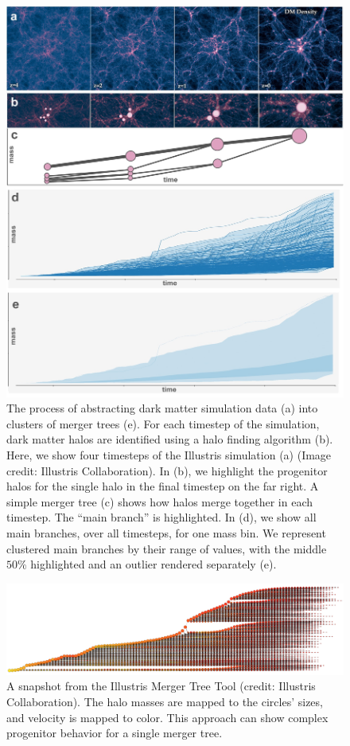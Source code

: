 \begin{figure}[h!]
\includegraphics[width=\textwidth]{images/clusters/particles_to_tree_cluster.jpg}
\caption{The process of abstracting dark matter simulation data (a) into clusters of merger trees (e). For each timestep of the simulation, dark matter halos are identified using a halo finding algorithm (b). Here, we show four timesteps of the Illustris simulation (a) (Image credit: Illustris Collaboration). In (b), we highlight the progenitor halos for the single halo in the final timestep on the far right. A simple merger tree (c) shows how halos merge together in each timestep. The ``main branch'' is highlighted. In (d), we show all main branches, over all timesteps, for one mass bin. We represent clustered main branches by their range of values, with the middle $50\%$ highlighted and an outlier rendered separately (e).}
\label{diagram}
\end{figure}

\begin{figure}[h!]
\includegraphics[width=\textwidth]{images/clusters/illustris_tool}
\caption{A snapshot from the Illustris Merger Tree Tool (credit: Illustris Collaboration). The halo masses are mapped to the circles' sizes, and velocity is mapped to color. This approach can show complex progenitor behavior for a single merger tree.}
\label{node_edge}
\end{figure}


